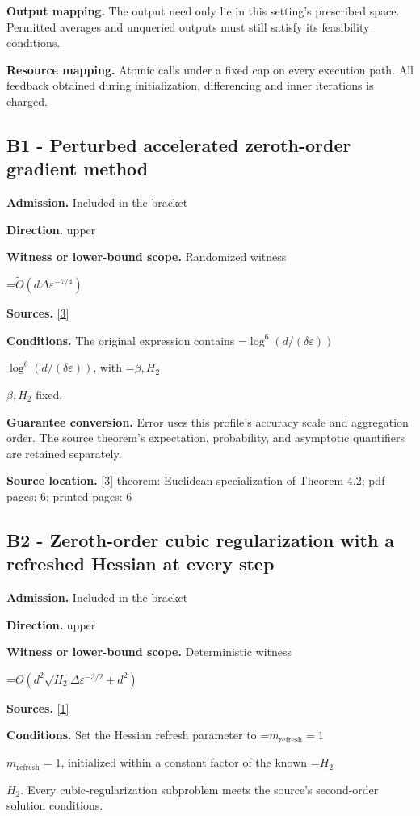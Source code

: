\documentclass[10pt,a4paper]{article}
\newcommand{\AtlasMath}[1]{\par\begingroup\centering\setbox0=\hbox{$\displaystyle #1$}\ifdim\wd0>1.4\linewidth\typeout{ATLAS WIDE FORMULA: \the\wd0}\fi\ifdim\wd0>\linewidth\resizebox{\linewidth}{!}{\box0}\else\box0\fi\par\endgroup}
\newcommand{\AtlasInlineMath}[1]{\begingroup\setbox0=\hbox{$#1$}\ifdim\wd0>.4\linewidth\endgroup\AtlasMath{#1}\else\endgroup$#1$\fi}
\begin{document}
\textbf{Output mapping.} The output need only lie in this setting's prescribed space. Permitted averages and unqueried outputs must still satisfy its feasibility conditions.

\textbf{Resource mapping.} Atomic calls under a fixed cap on every execution path. All feedback obtained during initialization, differencing and inner iterations is charged.

\subsection{B1 - Perturbed accelerated zeroth-order gradient method}
\textbf{Admission.} Included in the bracket

\textbf{Direction.} upper

\textbf{Witness or lower-bound scope.} Randomized witness

\AtlasMath{\widetilde{O}(d\Delta\varepsilon^{-7/4})}
\textbf{Sources.} \href{https://proceedings.mlr.press/v235/he24h.html}{[3]}

\textbf{Conditions.} The original expression contains \AtlasInlineMath{\log^6(d/(\delta\varepsilon))}, with \AtlasInlineMath{\beta ,H_2} fixed.

\textbf{Guarantee conversion.} Error uses this profile's accuracy scale and aggregation order. The source theorem's expectation, probability, and asymptotic quantifiers are retained separately.

\textbf{Source location.} \href{https://proceedings.mlr.press/v235/he24h.html}{[3]} theorem: Euclidean specialization of Theorem 4.2; pdf pages: 6; printed pages: 6

\subsection{B2 - Zeroth-order cubic regularization with a refreshed Hessian at every step}
\textbf{Admission.} Included in the bracket

\textbf{Direction.} upper

\textbf{Witness or lower-bound scope.} Deterministic witness

\AtlasMath{O(d^2\sqrt{H_2}\Delta\varepsilon^{-3/2}+d^2)}
\textbf{Sources.} \href{https://link.springer.com/article/10.1007/s10915-025-02842-z}{[1]}

\textbf{Conditions.} Set the Hessian refresh parameter to \AtlasInlineMath{m_{\mathrm{refresh}}=1}, initialized within a constant factor of the known \AtlasInlineMath{H_2}. Every cubic-regularization subproblem meets the source's second-order solution conditions.
\end{document}
